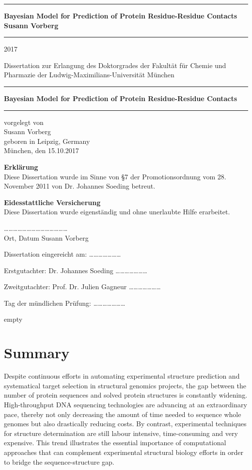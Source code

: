 \documentclass[11pt,a4paper,twoside]{book}
\newcommand{\LMUCover}[3]{
    \thispagestyle{empty}
    {\parindent0cm \rule{\linewidth}{.7ex}}
    
    \begin{flushright}
      \vspace*{\stretch{1}}
      \sffamily\bfseries\Huge
      #1\\
      \vspace*{\stretch{1}}
      \sffamily\bfseries\large
      #2
      \vspace*{\stretch{1}}
    \end{flushright}
  
    \rule{\linewidth}{.7ex}
    \vspace*{\stretch{5}}
    \vspace*{\stretch{1}}
    
    \begin{center}\sffamily\LARGE{#3}\end{center}
}
\newcommand{\LMUTitlePage}[4]{
    \thispagestyle{empty}
    \vspace*{\stretch{1}}
    
    \begin{center}
      \Large Dissertation zur Erlangung des Doktorgrades der Fakultät für Chemie und Pharmazie der Ludwig-Maximilians-Universität München
    \end{center}
    
    \vspace*{\stretch{1}}
    {\parindent0cm \rule{\linewidth}{.7ex}}
    
    \begin{flushright}
      \vspace*{\stretch{1}}
      \sffamily\bfseries\Huge
      #1\\
      \vspace*{\stretch{1}}
    \end{flushright}
  
    \rule{\linewidth}{.7ex}

    \vspace*{\stretch{3}}
    \begin{center}
      \Large vorgelegt von\\
      \Large #2\\
      \Large geboren in #3\\
      \vspace*{\stretch{2}}
      \Large München, den #4
    \end{center}
}
\newcommand{\LMUErklaerung}[5]{
    \thispagestyle{empty}
    \begin{flushleft}
      \large \textbf{Erklärung} \\[1mm]
      \large Diese Dissertation wurde im Sinne von §7 der Promotionsordnung vom 28. November 2011 von #2 betreut.
      \bigskip
  
      \large \textbf{Eidesstattliche Versicherung}\\[1mm]
      \large Diese Dissertation wurde eigenständig und ohne unerlaubte Hilfe erarbeitet.
      \vspace{5em}
  
      \dots\dots\dots   \dots\dots\dots \hfill \dots\dots\dots\dots\dots\dots\dots\dots\\
      \large Ort, Datum \hfill #1
      \vfill
  
  
      \large Dissertation eingereicht am: \hfill  \dots\dots\dots\dots\dots\dots\dots
      \bigskip
    
      \large Erstgutachter:  #2 \hfill \dots\dots\dots\dots\dots\dots\dots
      \bigskip
    
      \large Zweitgutachter: #3 \hfill \dots\dots\dots\dots\dots\dots\dots
      \bigskip
    
      \large Tag der mündlichen Prüfung: \hfill  \dots\dots\dots\dots\dots\dots\dots
    \end{flushleft}
}
\theoremstyle{definition}
\theoremstyle{definition}
\theoremstyle{remark}
\begin{document}
\frontmatter

\LMUCover
	{Bayesian Model for Prediction of Protein Residue-Residue Contacts}
	{Susann Vorberg}
	{2017}

\newpage
\thispagestyle{empty}
\cleardoublepage

\LMUTitlePage
	{Bayesian Model for Prediction of Protein Residue-Residue Contacts}
	{Susann Vorberg}
	{Leipzig, Germany}
	{15.10.2017}

\newpage
\thispagestyle{empty}
\cleardoublepage

\LMUErklaerung
	{Susann Vorberg}
	{Dr. Johannes Soeding}
	{Prof. Dr. Julien Gagneur}

\newpage
\thispagestyle{empty}
\cleardoublepage
\frontmatter\setcounter{page}{1}

\chapter*{Summary}\label{summary}

Despite continuous efforts in automating experimental structure
prediction and systematical target selection in structural genomics
projects, the gap between the number of protein sequences and solved
protein structures is constantly widening. High-throughput DNA
sequencing technologies are advancing at an extraordinary pace, thereby
not only decreasing the amount of time needed to sequence whole genomes
but also drastically reducing costs. By contrast, experimental
techniques for structure determination are still labour intensive,
time-consuming and very expensive. This trend illustrates the essential
importance of computational approaches that can complement experimental
structural biology efforts in order to bridge the sequence-structure
gap.
\end{document}
